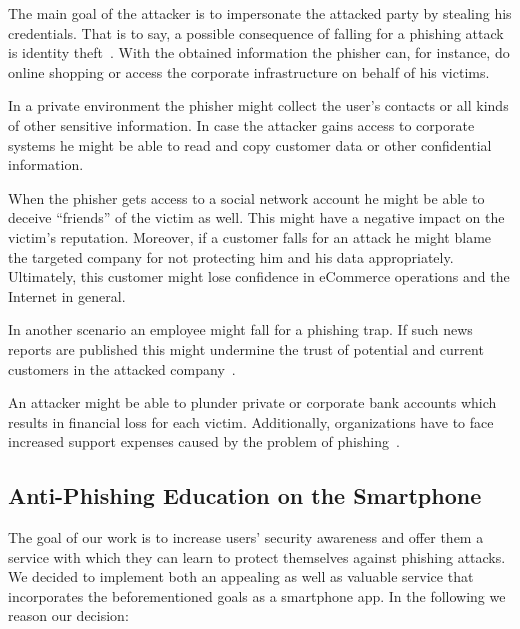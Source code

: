 \begin{description}[leftmargin=0cm]
\item[Identity Theft:] The main goal of the attacker is to impersonate the attacked party by stealing his credentials. That is to say, a possible consequence of falling for a phishing attack is identity theft~\cite{jakobsson2006phishing}. With the obtained information the phisher can, for instance, do online shopping or access the corporate infrastructure on behalf of his victims.
\item[Data Theft:]
In a private environment the phisher might collect the user's contacts or all kinds of other sensitive information.
In case the attacker gains access to corporate systems he might be able to read and copy customer data or other confidential information.
\item[Reputational Damage:]
When the phisher gets access to a social network account he might be able to deceive ``friends'' of the victim as well. This might have a negative impact on the victim's reputation.
Moreover, if a customer falls for an attack he might blame the targeted company for not protecting him and his data appropriately. 
Ultimately, this customer might lose confidence in eCommerce operations and the Internet in general.

In another scenario an employee might fall for a phishing trap.
If such news reports are published this might undermine the trust of potential and current customers in the attacked company~\cite{mcafee, redcondor}. 
\item[Financial Loss:]
An attacker might be able to plunder private or corporate bank accounts which results in financial loss for each victim. Additionally, organizations have to face increased support expenses caused by the problem of phishing~\cite{rsa2013, mcafee}.
\end{description}

\subsection{Anti-Phishing Education on the Smartphone}
\label{s:antiphishing_on_smartphone}
The goal of our work is to increase users' security awareness and offer them a service with which they can learn to protect themselves against phishing attacks.
We decided to implement both an appealing as well as valuable service that incorporates the beforementioned goals as a smartphone app.
In the following we reason our decision:

